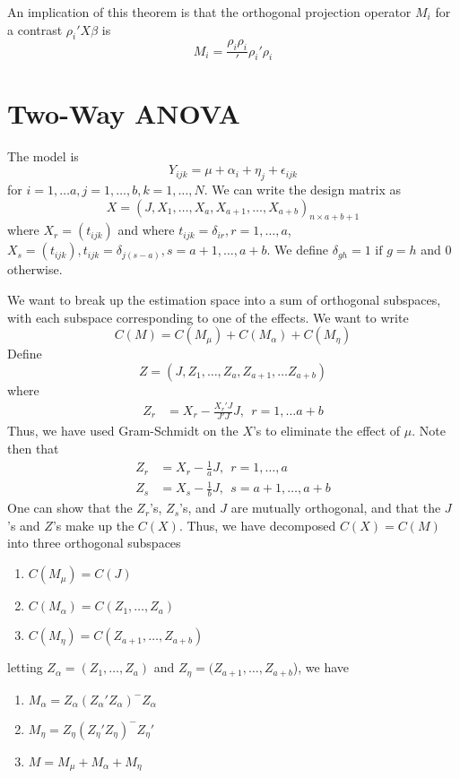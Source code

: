\documentclass[12pt]{article}
\numberwithin{equation}{section}
\begin{document}
An implication of this theorem is that the orthogonal projection operator $M_i$ for a contrast $\rho_i ' X \beta$ is
\begin{equation*}
  M_i = \frac{\rho_i \rho_i}'{\rho_i ' \rho_i}
\end{equation*}

\section{Two-Way ANOVA}
The model is
\begin{equation*}
  Y_{ijk} = \mu + \alpha_i + \eta_j + \epsilon_{ijk}
\end{equation*}
%
for $i = 1, \ldots a, j = 1, \ldots, b, k = 1, \ldots, N$. We can write the design matrix as
%
\begin{equation*}
  X = (J, X_1, \ldots, X_a, X_{a+1}, \ldots, X_{a + b})_{n \times a + b + 1}
\end{equation*}
%
where $X_r = (t_{ijk})$ and where $t_{ijk} = \delta_{ir}, r = 1, \ldots, a$, $X_s = (t_{ijk}), t_{ijk} = \delta_{j(s - a)}, s = a + 1, \ldots, a + b$. We define $\delta_{gh} = 1 \text{ if } g = h$ and 0 otherwise.

We want to break up the estimation space into a sum of orthogonal subspaces, with each subspace corresponding to one of the effects. We want to write
%
\begin{equation*}
  C(M) = C(M_\mu) + C(M_\alpha) + C(M_\eta)
\end{equation*}
%
Define
%
\begin{equation*}
  Z = (J, Z_1, \ldots, Z_a, Z_{a+1}, \ldots Z_{a+b})
\end{equation*}
%
where
%
\begin{align*}
  Z_r &= X_r - \frac{X_r'J}{J'J}J, \ \ r = 1, \ldots a + b
\end{align*}
%
Thus, we have used Gram-Schmidt on the $X$'s to eliminate the effect of $\mu$. Note then that
\begin{align*}
  Z_r &= X_r - \frac{1}{a}J, \ \ r = 1, \ldots, a \\
  Z_s & = X_s - \frac{1}{b} J, \ \ s = a + 1, \ldots, a + b
\end{align*}
%
One can show that the $Z_r$'s, $Z_s$'s, and $J$ are mutually orthogonal, and that the $J$'s and $Z$'s make up the $C(X)$. Thus, we have decomposed $C(X) = C(M)$ into three orthogonal subspaces
\begin{enumerate}
  \item $C(M_\mu) = C(J)$
  \item $C(M_\alpha) = C(Z_1, \ldots, Z_a)$
  \item $C(M_\eta) = C(Z_{a+1}, \ldots, Z_{a+b})$
\end{enumerate}
%
letting $Z_\alpha = (Z_1, \ldots, Z_a)$ and $Z_\eta = (Z_{a+1}, \ldots, Z_{a+b}$), we have
\begin{enumerate}
  \item $M_\alpha = Z_{\alpha} (Z_{\alpha}'Z_\alpha)^{-} Z_\alpha$
  \item $M_\eta = Z_\eta (Z_\eta' Z_\eta)^{-} Z_\eta'$
  \item $M = M_\mu + M_\alpha + M_\eta$
\end{enumerate}
\end{document}
